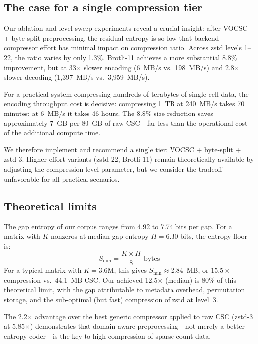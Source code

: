 \documentclass[10pt,twocolumn,letterpaper]{article}
\begin{document}
\subsection{The case for a single compression tier}

Our ablation and level-sweep experiments reveal a crucial insight: after VOCSC + byte-split preprocessing, the residual entropy is so low that backend compressor effort has minimal impact on compression ratio.
Across zstd levels 1--22, the ratio varies by only 1.3\%.
Brotli-11 achieves a more substantial 8.8\% improvement, but at 33$\times$ slower encoding (6~MB/s vs.\ 198~MB/s) and 2.8$\times$ slower decoding (1,397~MB/s vs.\ 3,959~MB/s).

For a practical system compressing hundreds of terabytes of single-cell data, the encoding throughput cost is decisive: compressing 1~TB at 240~MB/s takes 70 minutes; at 6~MB/s it takes 46 hours.
The 8.8\% size reduction saves approximately 7~GB per 80~GB of raw CSC---far less than the operational cost of the additional compute time.

We therefore implement and recommend a single tier: VOCSC + byte-split + zstd-3.
Higher-effort variants (zstd-22, Brotli-11) remain theoretically available by adjusting the compression level parameter, but we consider the tradeoff unfavorable for all practical scenarios.

\subsection{Theoretical limits}

The gap entropy of our corpus ranges from 4.92 to 7.74 bits per gap.
For a matrix with $K$ nonzeros at median gap entropy $H = 6.30$ bits, the entropy floor is:
\begin{equation}
S_{\min} = \frac{K \times H}{8} \text{ bytes}
\end{equation}
For a typical matrix with $K = 3.6$M, this gives $S_{\min} \approx 2.84$~MB, or $15.5\times$ compression vs.\ 44.1~MB CSC.
Our achieved 12.5$\times$ (median) is 80\% of this theoretical limit, with the gap attributable to metadata overhead, permutation storage, and the sub-optimal (but fast) compression of zstd at level~3.

The 2.2$\times$ advantage over the best generic compressor applied to raw CSC (zstd-3 at 5.85$\times$) demonstrates that domain-aware preprocessing---not merely a better entropy coder---is the key to high compression of sparse count data.
\end{document}
